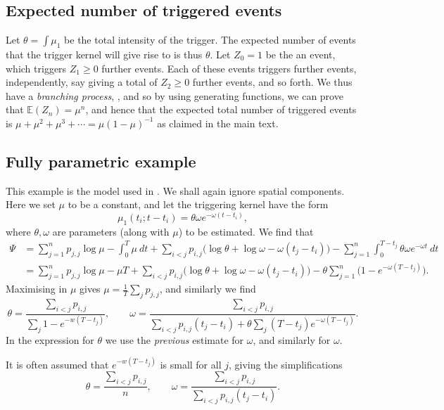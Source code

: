 \documentclass[twoside,a4paper]{article}
\theoremstyle{plain}
\theoremstyle{definition}
\begin{document}
\subsection{Expected number of triggered events}\label{app:gen_func}

Let $\theta = \int \mu_1$ be the total intensity of the trigger.  The expected number of
events that the trigger kernel will give rise to is thus $\theta$.
Let $Z_0=1$ be the an event, which triggers $Z_1 \geq 0$ further events.  Each of
these events triggers further events, independently, say giving a total of $Z_2\geq 0$
further events, and so forth.  We thus have a \emph{branching process}, \cite[Section~5.4]{gs},
and so by using generating functions, we can prove that $\mathbb E(Z_n) = \mu^n$, and hence
that the expected total number of triggered events is $\mu + \mu^2 + \mu^3 + \cdots
= \mu(1-\mu)^{-1}$ as claimed in the main text.



\subsection{Fully parametric example}\label{app:hawkes_em}

This example is the model used in \cite[Section~2]{lm}.
We shall again ignore spatial components.
Here we set $\mu$ to be a constant, and let the triggering kernel have the form
\[ \mu_1(t_i; t - t_i) = \theta \omega e^{-\omega(t-t_i)}, \]
where $\theta, \omega$ are parameters (along with $\mu$) to be estimated.
We find that
\begin{align*} \Psi &= \sum_{j=1}^n p_{j,j} \log\mu - \int_0^T \mu \ dt
+ \sum_{i<j} p_{i,j} \big( \log\theta + \log\omega - \omega(t_j-t_i) \big)
- \sum_{j=1}^n \int_0^{T-t_j} \theta \omega e^{-\omega t} \ dt \\
&= \sum_{j=1}^n p_{j,j} \log\mu - \mu T
+ \sum_{i<j} p_{i,j} \big( \log\theta + \log\omega - \omega(t_j-t_i) \big)
- \theta \sum_{j=1}^n \big(1 - e^{-\omega (T-t_j)}\big).
\end{align*}
Maximising in $\mu$ gives $\mu = \frac{1}{T} \sum_j p_{j,j}$, and similarly we find
\[ \theta = \frac{\sum_{i<j} p_{i,j}}{\sum_j 1 - e^{-w(T-t_j)}}, \qquad
\omega = \frac{\sum_{i<j} p_{i,j}}{\sum_{i<j} p_{i,j} (t_j-t_i) + \theta\sum_j (T-t_j)e^{-\omega(T-t_j)}}. \]
In the expression for $\theta$ we use the \emph{previous} estimate for $\omega$, and similarly
for $\omega$.

It is often assumed that $e^{-w(T-t_j)}$ is small for all $j$, giving the simplifications
\[ \theta = \frac{\sum_{i<j} p_{i,j}}{n}, \qquad
\omega = \frac{\sum_{i<j} p_{i,j}}{\sum_{i<j} p_{i,j} (t_j-t_i)}. \]
\end{document}

